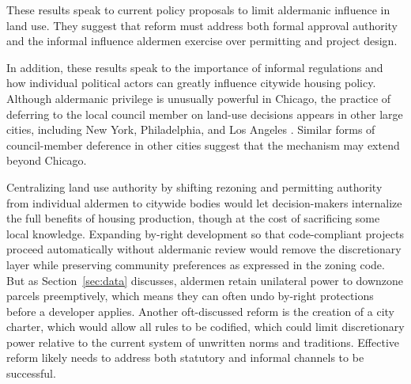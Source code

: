 These results speak to current policy proposals to limit aldermanic influence in land use.
They suggest that reform must address both formal approval authority and the informal influence aldermen exercise over permitting and project design.

In addition, these results speak to the importance of informal regulations and how individual political actors can greatly influence citywide housing policy.
Although aldermanic privilege is unusually powerful in Chicago, the practice of deferring to the local council member on land-use decisions appears in other large cities, including New York, Philadelphia, and Los Angeles \citep{the_pew_charitable_trusts_philadelphias_2015, associated_press_former_2024, anbinder_new_2025}.
Similar forms of council-member deference in other cities suggest that the mechanism may extend beyond Chicago.

Centralizing land use authority by shifting rezoning and permitting authority from individual aldermen to citywide bodies would let decision-makers internalize the full benefits of housing production, though at the cost of sacrificing some local knowledge.
Expanding by-right development so that code-compliant projects proceed automatically without aldermanic review would remove the discretionary layer while preserving community preferences as expressed in the zoning code.
But as Section~\ref{sec:data} discusses, aldermen retain unilateral power to downzone parcels preemptively, which means they can often undo by-right protections before a developer applies.
Another oft-discussed reform is the creation of a city charter, which would allow all rules to be codified, which could limit discretionary power relative to the current system of unwritten norms and traditions.
Effective reform likely needs to address both statutory and informal channels to be successful.

